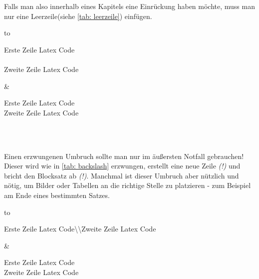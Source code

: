 Falls man also innerhalb eines Kapitels eine Einrückung haben möchte, muss man nur eine Leerzeile(siehe \ref{tab: leerzeile}) einfügen.\\%
\begin{table}[ht]%
\begin{tabu} to \textwidth {X[l]X[l]}%
\toprule%
	\begin{minipage}[t]{0.4\textwidth}%
	Erste Zeile Latex Code\\%
	\\%
	Zweite Zeile Latex Code%
	\end{minipage}%
&%
	\begin{minipage}[t]{0.4\textwidth}%
	Erste Zeile Latex Code\\%
	\hspace*{10.95pt}Zweite Zeile Latex Code%
	\end{minipage}\\%
\bottomrule%
\end{tabu}%
\caption{Einrückung durch Leerzeile}%
\label{tab: leerzeile}%
\end{table}\\%
%
Einen erzwungenen Umbruch sollte man nur im äußersten Notfall gebrauchen! Dieser wird wie in \ref{tab: backslash} erzwungen, erstellt eine neue Zeile \emph{(!)} und bricht den Blocksatz ab \emph{(!)}. Manchmal ist dieser Umbruch aber nützlich und nötig, um Bilder oder Tabellen an die richtige Stelle zu platzieren - zum Beispiel am Ende eines bestimmten Satzes.\\%
\begin{table}[h]%
\begin{tabu} to \textwidth {X[l]X[l]}%
\toprule%
	\begin{minipage}{0.4\textwidth}%
	Erste Zeile Latex Code\textbackslash \textbackslash Zweite Zeile Latex Code
	\end{minipage}%
&%
	\begin{minipage}{0.4\textwidth}%
	Erste Zeile Latex Code\\%
	\noindent Zweite Zeile Latex Code%
	\end{minipage}\\%
\bottomrule%
\end{tabu}%
\caption{Erzwungener Zeilenumbruch}%
\label{tab: backslash}%
\end{table}\\%
%
%
